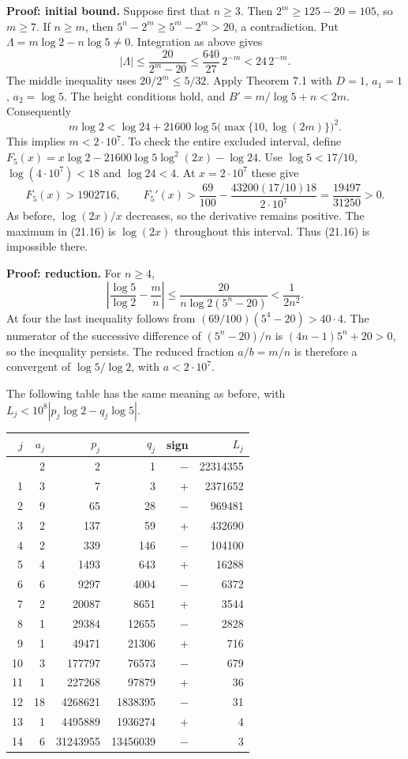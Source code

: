\documentclass[
  11pt,
  a4paper,
]{article}
\newcounter{none} %
\begin{document}
\textbf{Proof: initial bound.} Suppose first that \(n\ge3\). Then
\(2^m\ge125-20=105\), so \(m\ge7\). If \(n\ge m\), then
\(5^n-2^m\ge5^m-2^m>20\), a contradiction. Put
\(\Lambda=m\log2-n\log5\ne0\). Integration as above gives \[
 |\Lambda|\le\frac{20}{2^m-20}
 \le\frac{640}{27}\,2^{-m}<24\,2^{-m}.
 \tag{21.15}
\] The middle inequality uses \(20/2^m\le5/32\). Apply Theorem 7.1 with
\(D=1\), \(a_1=1\), \(a_2=\log5\). The height conditions hold, and
\(B'=m/\log5+n<2m\). Consequently \[
 m\log2<\log24+
 21600\log5\bigl(\max\{10,\log(2m)\}\bigr)^2.
 \tag{21.16}
\] This implies \(m<2\cdot10^7\). To check the entire excluded interval,
define \(F_5(x)=x\log2-21600\log5\log^2(2x)-\log24\). Use
\(\log5<17/10\), \(\log(4\cdot10^7)<18\) and \(\log24<4\). At
\(x=2\cdot10^7\) these give \[
 F_5(x)>1902716,\qquad
 F_5'(x)>\frac{69}{100}
 -\frac{43200(17/10)18}{2\cdot10^7}
 =\frac{19497}{31250}>0.
\] As before, \(\log(2x)/x\) decreases, so the derivative remains
positive. The maximum in (21.16) is \(\log(2x)\) throughout this
interval. Thus (21.16) is impossible there.

\textbf{Proof: reduction.} For \(n\ge4\), \[
 \left|\frac{\log5}{\log2}-\frac mn\right|
 \le\frac{20}{n\log2(5^n-20)}<\frac1{2n^2}.
 \tag{21.17}
\] At four the last inequality follows from
\((69/100)(5^4-20)>40\cdot4\). The numerator of the successive
difference of \((5^n-20)/n\) is \((4n-1)5^n+20>0\), so the inequality
persists. The reduced fraction \(a/b=m/n\) is therefore a convergent of
\(\log5/\log2\), with \(a<2\cdot10^7\).

The following table has the same meaning as before, with
\(L_j<10^8|p_j\log2-q_j\log5|\).

{\def\LTcaptype{none} %
\begin{longtable}[]{@{}rrrrrr@{}}
\toprule\noalign{}
\(j\) & \(a_j\) & \(p_j\) & \(q_j\) & sign & \(L_j\) \\
\midrule\noalign{}
\endhead
\bottomrule\noalign{}
\endlastfoot
0 & 2 & 2 & 1 & \(-\) & 22314355 \\
1 & 3 & 7 & 3 & + & 2371652 \\
2 & 9 & 65 & 28 & \(-\) & 969481 \\
3 & 2 & 137 & 59 & + & 432690 \\
4 & 2 & 339 & 146 & \(-\) & 104100 \\
5 & 4 & 1493 & 643 & + & 16288 \\
6 & 6 & 9297 & 4004 & \(-\) & 6372 \\
7 & 2 & 20087 & 8651 & + & 3544 \\
8 & 1 & 29384 & 12655 & \(-\) & 2828 \\
9 & 1 & 49471 & 21306 & + & 716 \\
10 & 3 & 177797 & 76573 & \(-\) & 679 \\
11 & 1 & 227268 & 97879 & + & 36 \\
12 & 18 & 4268621 & 1838395 & \(-\) & 31 \\
13 & 1 & 4495889 & 1936274 & + & 4 \\
14 & 6 & 31243955 & 13456039 & \(-\) & 3 \\
\end{longtable}
}
\end{document}
